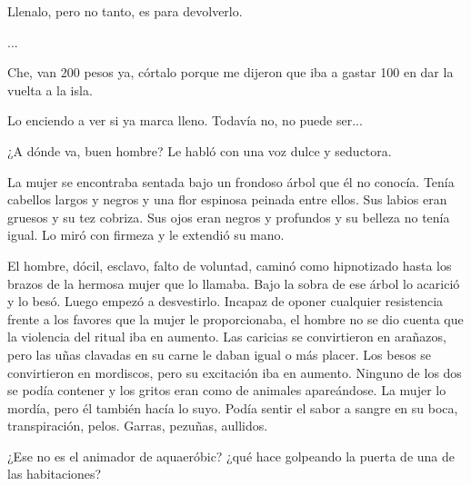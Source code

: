\documentclass[12pt,twoside,openright,a5paper]{book}
\begin{document}
Llenalo, pero no tanto, es para devolverlo.

...

Che, van 200 pesos ya, córtalo porque me dijeron que iba a gastar 100 en
dar la vuelta a la isla.

Lo enciendo a ver si ya marca lleno. Todavía no,
no puede ser...

\vspace{0.5cm}
\afterpage{}
\hrulefill\hspace{0.2cm} \decofourleft\decofourright \hspace{0.2cm} \hrulefill
\vspace{0.5cm}

¿A dónde va, buen hombre? Le habló con una voz dulce y seductora.

La mujer se encontraba sentada bajo un frondoso árbol que él no
conocía. Tenía cabellos largos y negros y una flor espinosa peinada entre
ellos. Sus labios eran gruesos y su tez cobriza. Sus ojos eran negros y
profundos y su belleza no tenía igual. Lo miró con firmeza y le extendió
su mano.

El hombre, dócil, esclavo, falto de voluntad, caminó como hipnotizado hasta
los brazos de la hermosa mujer que lo llamaba. Bajo la sobra de ese árbol
lo acarició y lo besó. Luego empezó a desvestirlo. Incapaz de oponer
cualquier resistencia frente a los favores que la mujer le proporcionaba,
el hombre no se dio cuenta que la violencia del ritual iba en aumento. Las
caricias se convirtieron en arañazos, pero las uñas clavadas en su carne
le daban igual o más placer. Los besos se convirtieron en mordiscos, pero
su excitación iba en aumento. Ninguno de los dos se podía contener y
los gritos eran como de animales apareándose. La mujer lo mordía, pero
él también hacía lo suyo. Podía sentir el sabor a sangre en su boca,
transpiración, pelos. Garras, pezuñas, aullidos.

\vspace{0.5cm}

\hrulefill\hspace{0.2cm} \decofourleft\decofourright \hspace{0.2cm} \hrulefill
\vspace{0.5cm}

¿Ese no es el animador de aquaeróbic? ¿qué hace golpeando la puerta
de una de las habitaciones?

\vspace{0.5cm}

\hrulefill\hspace{0.2cm} \decofourleft\decofourright \hspace{0.2cm} \hrulefill
\vspace{0.5cm}
\end{document}
